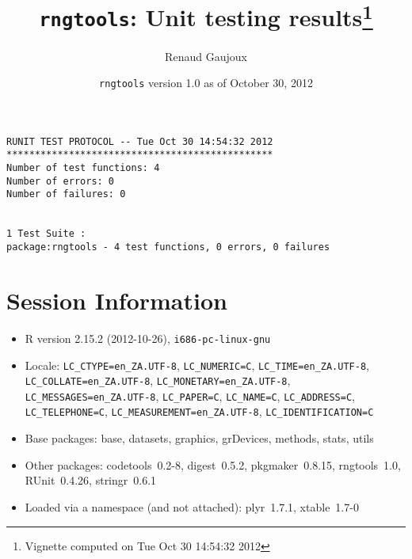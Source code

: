 \documentclass[10pt]{article}
\author{Renaud Gaujoux}
\title{\texttt{rngtools}: Unit testing results\footnote{Vignette computed  on Tue Oct 30 14:54:32 2012}}
\date{\texttt{rngtools} version 1.0 as of October 30, 2012}
\begin{document}
\maketitle

\begin{verbatim}
RUNIT TEST PROTOCOL -- Tue Oct 30 14:54:32 2012 
*********************************************** 
Number of test functions: 4 
Number of errors: 0 
Number of failures: 0 

 
1 Test Suite : 
package:rngtools - 4 test functions, 0 errors, 0 failures
\end{verbatim}

\section*{Session Information}
\begin{itemize}\raggedright
  \item R version 2.15.2 (2012-10-26), \verb|i686-pc-linux-gnu|
  \item Locale: \verb|LC_CTYPE=en_ZA.UTF-8|, \verb|LC_NUMERIC=C|, \verb|LC_TIME=en_ZA.UTF-8|, \verb|LC_COLLATE=en_ZA.UTF-8|, \verb|LC_MONETARY=en_ZA.UTF-8|, \verb|LC_MESSAGES=en_ZA.UTF-8|, \verb|LC_PAPER=C|, \verb|LC_NAME=C|, \verb|LC_ADDRESS=C|, \verb|LC_TELEPHONE=C|, \verb|LC_MEASUREMENT=en_ZA.UTF-8|, \verb|LC_IDENTIFICATION=C|
  \item Base packages: base, datasets, graphics, grDevices, methods,
    stats, utils
  \item Other packages: codetools~0.2-8, digest~0.5.2, pkgmaker~0.8.15,
    rngtools~1.0, RUnit~0.4.26, stringr~0.6.1
  \item Loaded via a namespace (and not attached): plyr~1.7.1,
    xtable~1.7-0
\end{itemize}
\end{document}
